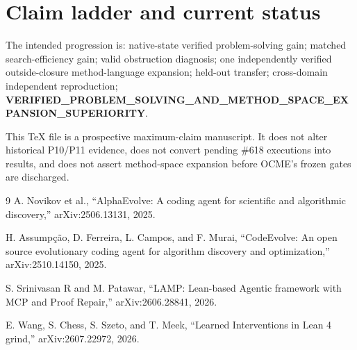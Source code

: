 \documentclass[11pt]{article}
\begin{document}
\section{Claim ladder and current status}
The intended progression is: native-state verified problem-solving gain; matched search-efficiency gain; valid obstruction diagnosis; one independently verified outside-closure method-language expansion; held-out transfer; cross-domain independent reproduction; \textbf{VERIFIED\_PROBLEM\_SOLVING\_AND\_METHOD\_SPACE\_EXPANSION\_SUPERIORITY}.

This TeX file is a prospective maximum-claim manuscript. It does not alter historical P10/P11 evidence, does not convert pending \#618 executions into results, and does not assert method-space expansion before OCME's frozen gates are discharged.

\begin{thebibliography}{9}
A. Novikov et al., ``AlphaEvolve: A coding agent for scientific and algorithmic discovery,'' arXiv:2506.13131, 2025.

H. Assump\c{c}\~ao, D. Ferreira, L. Campos, and F. Murai, ``CodeEvolve: An open source evolutionary coding agent for algorithm discovery and optimization,'' arXiv:2510.14150, 2025.

S. Srinivasan R and M. Patawar, ``LAMP: Lean-based Agentic framework with MCP and Proof Repair,'' arXiv:2606.28841, 2026.

E. Wang, S. Chess, S. Szeto, and T. Meek, ``Learned Interventions in Lean 4 grind,'' arXiv:2607.22972, 2026.
\end{thebibliography}
\end{document}
